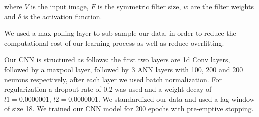 \documentclass[12pt,journal,compsoc]{IEEEtran}
\begin{document}
where $V$ is the input image, $F$ is the symmetric filter size, $w$ are the filter weights and $\delta$ is the activation function.
\par We used a max polling layer to sub sample our data, in order to reduce the computational cost of our learning process as well as reduce overfitting.
\par Our CNN is structured as follows: the first two layers are 1d Conv layers, followed by a maxpool layer, followed by 3 ANN layers with 100, 200 and 200 neurons respectively, after each layer we used batch normalization.
For regularization a dropout rate of 0.2 was used and a weight decay of $l1=0.0000001$, $l2=0.0000001$.
We standardized our data and used a lag window of size 18.
We trained our CNN model for 200 epochs with pre-emptive stopping.
\end{document}
